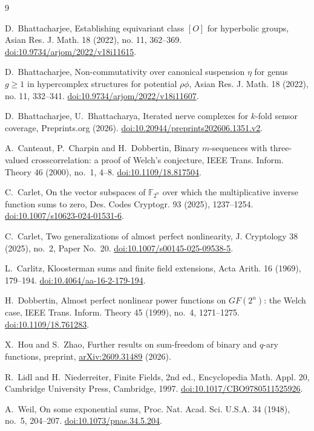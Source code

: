 \documentclass[11pt,a4paper,reqno]{amsart}
\theoremstyle{remark}
\numberwithin{equation}{section}
\newcommand{\F}{\mathbb{F}}
\begin{document}
\begin{thebibliography}{9}

D.~Bhattacharjee, Establishing equivariant class $[O]$ for hyperbolic groups, Asian Res. J. Math. 18 (2022), no. 11, 362--369. \href{https://doi.org/10.9734/arjom/2022/v18i11615}{doi:10.9734/arjom/2022/v18i11615}.

D.~Bhattacharjee, Non-commutativity over canonical suspension $\eta$ for genus $g\ge1$ in hypercomplex structures for potential $\rho\phi$, Asian Res. J. Math. 18 (2022), no. 11, 332--341. \href{https://doi.org/10.9734/arjom/2022/v18i11607}{doi:10.9734/arjom/2022/v18i11607}.

D.~Bhattacharjee, U.~Bhattacharya, Iterated nerve complexes for $k$-fold sensor coverage, Preprints.org (2026). \href{https://doi.org/10.20944/preprints202606.1351.v2}{doi:10.20944/preprints202606.1351.v2}.

A.~Canteaut, P.~Charpin and H.~Dobbertin, Binary $m$-sequences with three-valued crosscorrelation: a proof of Welch's conjecture, IEEE Trans. Inform. Theory 46 (2000), no.~1, 4--8. \href{https://doi.org/10.1109/18.817504}{doi:10.1109/18.817504}.

C.~Carlet, On the vector subspaces of $\F_{2^n}$ over which the multiplicative inverse function sums to zero, Des. Codes Cryptogr. 93 (2025), 1237--1254. \href{https://doi.org/10.1007/s10623-024-01531-6}{doi:10.1007/s10623-024-01531-6}.

C.~Carlet, Two generalizations of almost perfect nonlinearity, J. Cryptology 38 (2025), no.~2, Paper No.~20. \href{https://doi.org/10.1007/s00145-025-09538-5}{doi:10.1007/s00145-025-09538-5}.

L.~Carlitz, Kloosterman sums and finite field extensions, Acta Arith. 16 (1969), 179--194. \href{https://doi.org/10.4064/aa-16-2-179-194}{doi:10.4064/aa-16-2-179-194}.

H.~Dobbertin, Almost perfect nonlinear power functions on $GF(2^n)$: the Welch case, IEEE Trans. Inform. Theory 45 (1999), no.~4, 1271--1275. \href{https://doi.org/10.1109/18.761283}{doi:10.1109/18.761283}.

X.~Hou and S.~Zhao, Further results on sum-freedom of binary and $q$-ary functions, preprint, \href{https://arxiv.org/abs/2609.31489}{arXiv:2609.31489} (2026).

R.~Lidl and H.~Niederreiter, Finite Fields, 2nd ed., Encyclopedia Math. Appl. 20, Cambridge University Press, Cambridge, 1997. \href{https://doi.org/10.1017/CBO9780511525926}{doi:10.1017/CBO9780511525926}.

A.~Weil, On some exponential sums, Proc. Nat. Acad. Sci. U.S.A. 34 (1948), no.~5, 204--207. \href{https://doi.org/10.1073/pnas.34.5.204}{doi:10.1073/pnas.34.5.204}.

\end{thebibliography}
\end{document}
